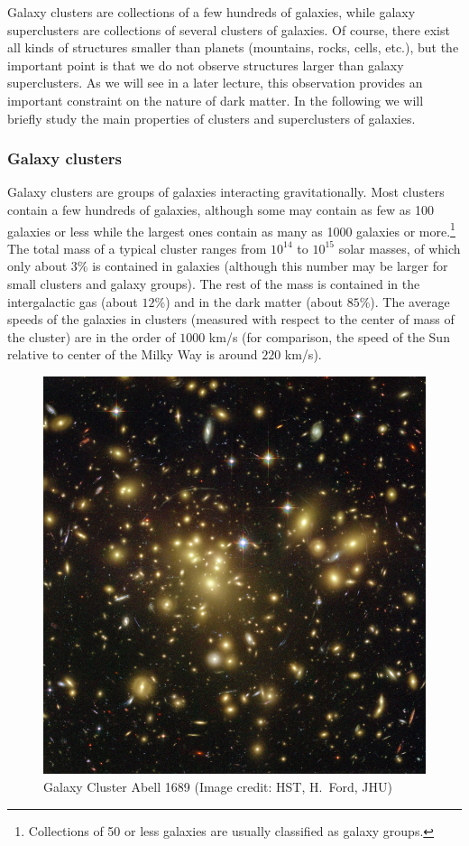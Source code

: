 Galaxy clusters are collections of a few hundreds of galaxies, while galaxy superclusters are collections of several clusters of galaxies. Of course, there exist all kinds of structures smaller than planets (mountains, rocks, cells, etc.), but the important point is that we do not observe structures larger than galaxy superclusters. As we will see in a later lecture, this observation provides an important constraint on the nature of dark matter. In the following we will briefly study the main properties of clusters and superclusters of galaxies.

\subsubsection{Galaxy clusters}

Galaxy clusters are groups of galaxies interacting gravitationally. Most clusters contain a few hundreds of galaxies, although some may contain as few as 100 galaxies or less while the largest ones contain as many as 1000 galaxies or more.\footnote{Collections of 50 or less galaxies are usually classified as galaxy groups.} The total mass of a typical cluster ranges from $10^{14}$ to $10^{15}$ solar masses, of which only about $3\%$ is contained in galaxies (although this number may be larger for small clusters and galaxy groups). The rest of the mass is contained in the intergalactic gas (about $12\%$) and in the dark matter (about $85\%$). The average speeds of the galaxies in clusters (measured with respect to the center of mass of the cluster) are in the order of $1000$ km/s (for comparison, the speed of the Sun relative to center of the Milky Way is around $220$ km/s).
\begin{figure}[ht]
\begin{center}
\includegraphics[scale=1.2]{Draw/lec8_1.png}
\end{center}
\caption{Galaxy Cluster Abell 1689 (Image credit: HST, H.\ Ford, JHU)}
\label{fig:lec8_1}
\end{figure}

